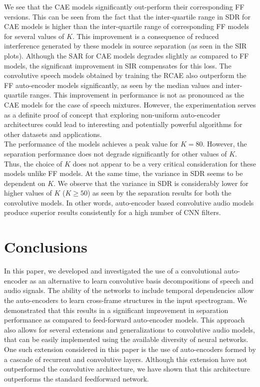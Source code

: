 \documentclass{article}
\begin{document}
We see that the CAE models significantly out-perform their corresponding FF versions. This can be seen from the fact that the inter-quartile range in SDR for CAE models is higher than the inter-quartile range of corresponding FF models for several values of $K$. This improvement is a consequence of reduced interference generated by these models in source separation (as seen in the SIR plots). Although the SAR for CAE models degrades slightly as compared to FF models, the significant improvement in SIR compensates for this loss. The convolutive speech models obtained by training the RCAE also outperform the FF auto-encoder models significantly, as seen by the median values and inter-quartile ranges. This improvement in performance is not as pronounced as the CAE models for the case of speech mixtures. However, the experimentation serves as a definite proof of concept that exploring non-uniform auto-encoder architectures could lead to interesting and potentially powerful algorithms for other datasets and applications. \\  

The performance of the models achieves a peak value for $K=80$. However, the separation performance does not degrade significantly for other values of $K$. Thus, the choice of $K$ does not appear to be a very critical consideration for these models unlike FF models. At the same time, the variance in SDR seems to be dependent on $K$. We observe that the variance in SDR is considerably lower for higher values of $K$ ($K\geq50$) as seen by the separation results for both the convolutive models. In other words, auto-encoder based convolutive audio models produce superior results consistently for a high number of CNN filters. \\

\section{Conclusions}
\label{sec:conclusion}
In this paper, we developed and investigated the use of a convolutional auto-encoder as an alternative to learn convolutive basis decompositions of speech and audio signals. The ability of the networks to include temporal dependencies allow the auto-encoders to learn cross-frame structures in the input spectrogram. We demonstrated that this results in a significant improvement in separation performance as compared to feed-forward auto-encoder models. This approach also allows for several extensions and generalizations to convolutive audio models, that can be easily implemented using the available diversity of neural networks. One such extension considered in this paper is the use of auto-encoders formed by a cascade of recurrent and convolutive layers. Although this extension have not outperformed the convolutive architecture, we have shown that this architecture outperforms the standard feedforward network. \\



\end{document}
